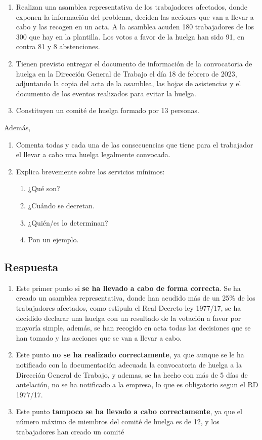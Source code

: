 \begin{enumerate}
    \item Realizan una asamblea representativa de los trabajadores afectados, donde exponen la información del problema, deciden las acciones que van a llevar a cabo y las recogen en un acta. A la asamblea acuden 180 trabajadores de los 300 que hay en la plantilla. Los votos a favor de la huelga han sido 91, en contra 81  y 8 abstenciones.
    \item Tienen previsto entregar el documento de información de la convocatoria de huelga en la Dirección General de Trabajo el día 18 de febrero de 2023, adjuntando la copia del acta de la asamblea, las hojas de asistencias y el documento de los eventos realizados para evitar la huelga.
    \item Constituyen un comité de huelga formado por 13 personas.
\end{enumerate}

Además,

\begin{enumerate}[label=(\alph*)]
    \item Comenta todas y cada una de las consecuencias que tiene para el trabajador el llevar a cabo una huelga legalmente convocada.
    \item Explica brevemente sobre los servicios mínimos:
    \begin{enumerate}
        \item ¿Qué son?
        \item ¿Cuándo se decretan.
        \item ¿Quién/es lo determinan?
        \item Pon un ejemplo.
    \end{enumerate}
\end{enumerate}

\subsection{Respuesta}

\begin{enumerate}
    \item Este primer punto si \textbf{se ha llevado a cabo de forma correcta}. Se ha creado un asamblea representativa, donde han acudido más de un 25\% de los trabajadores afectados, como estipula el Real Decreto-ley 1977/17, se ha decidido declarar una huelga con un resultado de la votación a favor por mayoría simple, además, se han recogido en acta todas las decisiones que se han tomado y las acciones que se van a llevar a cabo.

    \item Este punto \textbf{no se ha realizado correctamente}, ya que aunque se le ha notificado con la documentación adecuada la convocatoria de huelga a la Dirección General de Trabajo, y ademas, se ha hecho con más de 5 días de antelación, no se ha notificado a la empresa, lo que es obligatorio segun el RD 1977/17.

    \item Este punto \textbf{tampoco se ha llevado a cabo correctamente}, ya que el número máximo de miembros del comité de huelga es de 12, y los trabajadores han creado un comité
\end{enumerate}

